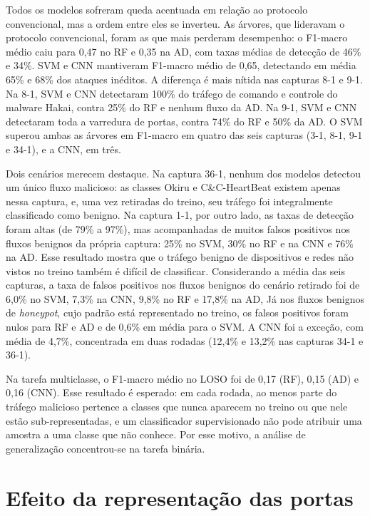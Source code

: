Todos os modelos sofreram queda acentuada em relação ao protocolo convencional, mas a ordem entre eles se inverteu. As árvores, que lideravam o protocolo convencional, foram as que mais perderam desempenho: o F1-macro médio caiu para 0,47 no RF e 0,35 na AD, com taxas médias de detecção de 46\% e 34\%. SVM e CNN mantiveram F1-macro médio de 0,65, detectando em média 65\% e 68\% dos ataques inéditos. A diferença é mais nítida nas capturas 8-1 e 9-1. Na 8-1, SVM e CNN detectaram 100\% do tráfego de comando e controle do malware Hakai, contra 25\% do RF e nenhum fluxo da AD. Na 9-1, SVM e CNN detectaram toda a varredura de portas, contra 74\% do RF e 50\% da AD. O SVM superou ambas as árvores em F1-macro em quatro das seis capturas (3-1, 8-1, 9-1 e 34-1), e a CNN, em três.

Dois cenários merecem destaque. Na captura 36-1, nenhum dos modelos detectou um único fluxo malicioso: as classes Okiru e C\&C-HeartBeat existem apenas nessa captura, e, uma vez retiradas do treino, seu tráfego foi integralmente classificado como benigno. Na captura 1-1, por outro lado, as taxas de detecção foram altas (de 79\% a 97\%), mas acompanhadas de muitos falsos positivos nos fluxos benignos da própria captura: 25\% no SVM, 30\% no RF e na CNN e 76\% na AD. Esse resultado mostra que o tráfego benigno de dispositivos e redes não vistos no treino também é difícil de classificar. Considerando a média das seis capturas, a taxa de falsos positivos nos fluxos benignos do cenário retirado foi de 6,0\% no SVM, 7,3\% na CNN, 9,8\% no RF e 17,8\% na AD, Já nos fluxos benignos de \textit{honeypot}, cujo padrão está representado no treino, os falsos positivos foram nulos para RF e AD e de 0,6\% em média para o SVM. A CNN foi a exceção, com média de 4,7\%, concentrada em duas rodadas (12,4\% e 13,2\% nas capturas 34-1 e 36-1).

Na tarefa multiclasse, o F1-macro médio no LOSO foi de 0,17 (RF), 0,15 (AD) e 0,16 (CNN). Esse resultado é esperado: em cada rodada, ao menos parte do tráfego malicioso pertence a classes que nunca aparecem no treino ou que nele estão sub-representadas, e um classificador supervisionado não pode atribuir uma amostra a uma classe que não conhece. Por esse motivo, a análise de generalização concentrou-se na tarefa binária.

\section{Efeito da representação das portas}
\label{sec:res-portas}

